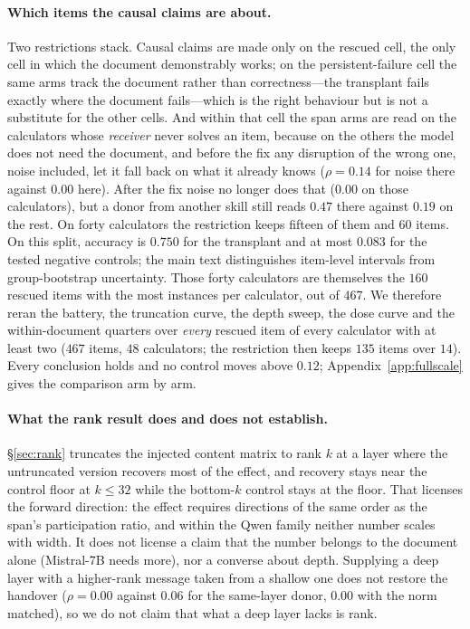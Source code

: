 \documentclass{article}
\begin{document}
\paragraph{Which items the causal claims are about.} Two restrictions stack.
Causal claims are made only on the rescued cell, the only cell in which the
document demonstrably works; on the persistent-failure cell the same arms track
the document rather than correctness---the transplant fails exactly where the
document fails---which is the right behaviour but is not a substitute for the
other cells. And within that cell the span arms are read on the calculators
whose \emph{receiver} never solves an item, because on the others the model does
not need the document, and before the fix any disruption of the wrong one,
noise included, let it fall back on what it already knows ($\rho = 0.14$ for
noise there against $0.00$ here). After the fix noise no longer does that
($0.00$ on those calculators), but a donor from another skill still reads $0.47$
there against $0.19$ on the rest. On forty calculators the restriction keeps fifteen of them and
$60$ items. On this split, accuracy is $0.750$ for the transplant and at most
$0.083$ for the tested negative controls; the main text distinguishes item-level
intervals from group-bootstrap uncertainty. Those forty calculators are
themselves the $160$ rescued items with the most instances per calculator, out
of $467$. We therefore reran the battery, the truncation curve, the depth sweep,
the dose curve and the within-document quarters over \emph{every} rescued item
of every calculator with at least two ($467$ items, $48$ calculators; the
restriction then keeps $135$ items over $14$). Every conclusion holds and no
control moves above $0.12$; Appendix~\ref{app:fullscale} gives the comparison
arm by arm.

\paragraph{What the rank result does and does not establish.}
\S\ref{sec:rank} truncates the injected content matrix to rank $k$ at a layer
where the untruncated version recovers most of the effect, and recovery stays near the control floor at $k \le 32$ while the bottom-$k$ control stays at the floor. That
licenses the forward direction: the effect requires directions of the same order
as the span's participation ratio, and within the Qwen family neither number
scales with width. It does not license a claim that the number belongs to the
document alone (Mistral-7B needs more), nor a converse about depth. Supplying a deep layer
with a higher-rank message taken from a shallow one does not restore the
handover ($\rho=0.00$ against $0.06$ for the same-layer donor, $0.00$ with the
norm matched), so we do not claim that what a deep layer lacks is rank.
\end{document}

